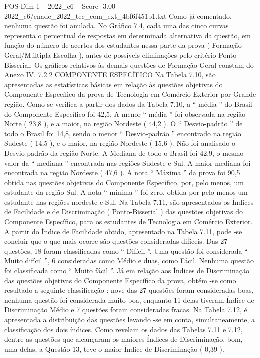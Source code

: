 \begin{textsample}{POS Dim 1 – 2022\_c6 – Score -3.00 – 2022\_c6/enade\_2022\_tec\_com\_ext\_4bf6f451b1.txt}
Como já comentado, nenhuma questão foi anulada.
No Gráfico 7.4, cada uma das cinco curvas representa o percentual de respostas em determinada alternativa da questão, em função do número de acertos dos estudantes nessa parte da prova ( Formação Geral/Múltipla Escolha ), antes de possíveis eliminações pelo critério Ponto-Bisserial.
Os gráficos relativos às demais questões de Formação Geral constam do Anexo IV. 7.2.2 COMPONENTE ESPECÍFICO Na Tabela 7.10, são apresentadas as estatísticas básicas em relação às questões objetivas do Componente Específico da prova de Tecnologia em Comércio Exterior por Grande região.
Como se verifica a partir dos dados da Tabela 7.10, a “ média ” do Brasil do Componente Específico foi 42,5.
A menor “ média ” foi observada na região Norte ( 23,8 ), e a maior, na região Nordeste ( 44,2 ).
O “ Desvio-padrão ” de todo o Brasil foi 14,8, sendo o menor “ Desvio-padrão ” encontrado na região Sudeste ( 14,5 ), e o maior, na região Nordeste ( 15,6 ).
Não foi analisado o Desvio-padrão da região Norte.
A Mediana de todo o Brasil foi 42,9, o mesmo valor da “ mediana ” encontrada nas regiões Sudeste e Sul.
A maior mediana foi encontrada na região Nordeste ( 47,6 ).
A nota “ Máxima ” da prova foi 90,5 obtida nas questões objetivas do Componente Específico, por, pelo menos, um estudante da região Sul.
A nota “ mínima ” foi zero, obtida por pelo menos um estudante nas regiões nordeste e Sul.
Na Tabela 7.11, são apresentados os Índices de Facilidade e de Discriminação ( Ponto-Bisserial ) das questões objetivas do Componente Específico, para os estudantes de Tecnologia em Comércio Exterior.
A partir do Índice de Facilidade obtido, apresentado na Tabela 7.11, pode -se concluir que o que mais ocorre são questões consideradas difíceis.
Das 27 questões, 18 foram classificadas como “ Difícil ”.
Uma questão foi considerada “ Muito difícil ”, 6 consideradas como Médio e duas, como Fácil.
Nenhuma questão foi classificada como “ Muito fácil ”.
Já em relação aos Índices de Discriminação das questões objetivas do Componente Específico da prova, obtém -se como resultado a seguinte classificação : nove das 27 questões foram consideradas boas, nenhuma questão foi considerada muito boa, enquanto 11 delas tiveram Índice de Discriminação Médio e 7 questões foram consideradas fracas.
Na Tabela 7.12, é apresentada a distribuição das questões levando -se em conta, simultaneamente, a classificação dos dois índices.
Como revelam os dados das Tabelas 7.11 e 7.12, dentre as questões que alcançaram os maiores Índices de Discriminação, bom, uma delas, a Questão 13, teve o maior Índice de Discriminação ( 0,39 ).

\end{textsample}
